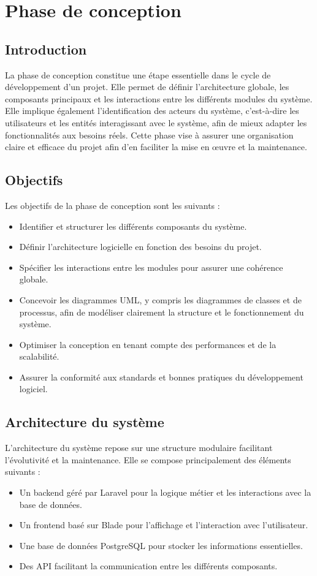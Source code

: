 \chapter{Phase de conception}

\section{Introduction}
La phase de conception constitue une étape essentielle dans le cycle de développement d'un projet. Elle permet de définir l'architecture globale, les composants principaux et les interactions entre les différents modules du système. Elle implique également l'identification des acteurs du système, c'est-à-dire les utilisateurs et les entités interagissant avec le système, afin de mieux adapter les fonctionnalités aux besoins réels. Cette phase vise à assurer une organisation claire et efficace du projet afin d'en faciliter la mise en œuvre et la maintenance.

\section{Objectifs}
Les objectifs de la phase de conception sont les suivants :
\begin{itemize}
    \item Identifier et structurer les différents composants du système.
    \item Définir l'architecture logicielle en fonction des besoins du projet.
    \item Spécifier les interactions entre les modules pour assurer une cohérence globale.
    \item Concevoir les diagrammes UML, y compris les diagrammes de classes et de processus, afin de modéliser clairement la structure et le fonctionnement du système.
    \item Optimiser la conception en tenant compte des performances et de la scalabilité.
    \item Assurer la conformité aux standards et bonnes pratiques du développement logiciel.
\end{itemize}

\section{Architecture du système}
L'architecture du système repose sur une structure modulaire facilitant l'évolutivité et la maintenance. Elle se compose principalement des éléments suivants :
\begin{itemize}
    \item Un backend géré par Laravel pour la logique métier et les interactions avec la base de données.
    \item Un frontend basé sur Blade pour l'affichage et l'interaction avec l'utilisateur.
    \item Une base de données PostgreSQL pour stocker les informations essentielles.
    \item Des API facilitant la communication entre les différents composants.
\end{itemize}

